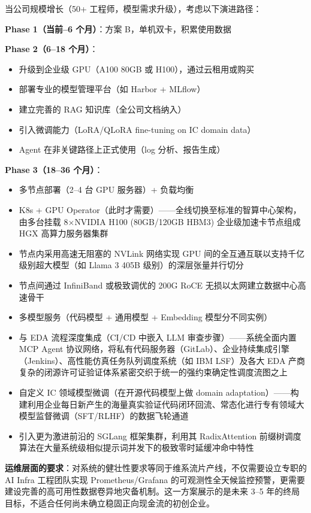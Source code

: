 \documentclass[UTF8,a4paper,10pt,oneside]{ctexart}
\begin{document}
当公司规模增长（50+ 工程师，模型需求升级），考虑以下演进路径：

\textbf{Phase 1（当前--6 个月）}：方案 B，单机双卡，积累使用数据

\textbf{Phase 2（6--18 个月）}：
\begin{itemize}
    \item 升级到企业级 GPU（A100 80GB 或 H100），通过云租用或购买
    \item 部署专业的模型管理平台（如 Harbor + MLflow）
    \item 建立完善的 RAG 知识库（全公司文档纳入）
    \item 引入微调能力（LoRA/QLoRA fine-tuning on IC domain data）
    \item Agent 在非关键路径上正式使用（log 分析、报告生成）
\end{itemize}

\textbf{Phase 3（18--36 个月）}：
\begin{itemize}
    \item 多节点部署（2--4 台 GPU 服务器）+ 负载均衡
    \item K8s + GPU Operator（此时才需要）——全线切换至标准的智算中心架构，由多台挂载 8$\times$NVIDIA H100 (80GB/120GB HBM3) 企业级加速卡节点组成 HGX 高算力服务器集群
    \item 节点内采用高速无阻塞的 NVLink 网络实现 GPU 间的全互通互联以支持千亿级别超大模型（如 Llama 3 405B 级别）的深层张量并行切分
    \item 节点间通过 InfiniBand 或极致调优的 200G RoCE 无损以太网建立数据中心高速骨干
    \item 多模型服务（代码模型 + 通用模型 + Embedding 模型分不同实例）
    \item 与 EDA 流程深度集成（CI/CD 中嵌入 LLM 审查步骤）——系统全面内置 MCP Agent 协议网络，将私有代码服务器（GitLab）、企业持续集成引擎（Jenkins）、高性能仿真任务队列调度系统（如 IBM LSF）及各大 EDA 产商复杂的闭源许可证验证体系紧密交织于统一的强约束确定性调度流图之上
    \item 自定义 IC 领域模型微调（在开源代码模型上做 domain adaptation）——构建利用企业每日新产生的海量真实验证代码闭环回流、常态化进行专有领域大模型监督微调（SFT/RLHF）的数据飞轮通道
    \item 引入更为激进前沿的 SGLang 框架集群，利用其 RadixAttention 前缀树调度算法在大量系统级相似提示词并发下的极致零时延缓冲命中特性
\end{itemize}

\textbf{运维层面的要求}：对系统的健壮性要求等同于维系流片产线，不仅需要设立专职的 AI Infra 工程团队实现 Prometheus/Grafana 的可观测性全天候监控预警，更需要建设完善的高可用性数据卷异地灾备机制。这一方案展示的是未来 3--5 年的终局目标，不适合任何尚未确立稳固正向现金流的初创企业。
\end{document}
